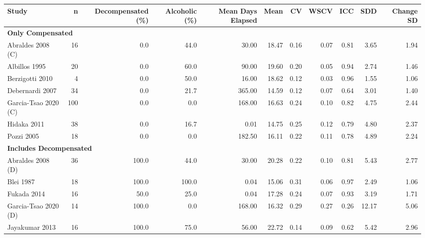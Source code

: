 \documentclass[
]{article}
\begin{document}
\begin{table}[H]
\centering
\begin{tabular}{l|r|r|r|r|r|r|r|r|r|r}
\hline
Study & n & Decompensated (\%) & Alcoholic (\%) & Mean Days Elapsed & Mean & CV & WSCV & ICC & SDD & Change SD\\
\hline
\multicolumn{11}{l}{\textbf{Only Compensated}}\\
\hline
\hspace{1em}Abraldes 2008 (C) & 16 & 0.0 & 44.0 & 30.00 & 18.47 & 0.16 & 0.07 & 0.81 & 3.65 & 1.94\\
\hline
\hspace{1em}Albillos 1995 & 20 & 0.0 & 60.0 & 90.00 & 19.60 & 0.20 & 0.05 & 0.94 & 2.74 & 1.46\\
\hline
\hspace{1em}Berzigotti 2010 & 4 & 0.0 & 50.0 & 16.00 & 18.62 & 0.12 & 0.03 & 0.96 & 1.55 & 1.06\\
\hline
\hspace{1em}Debernardi 2007 & 34 & 0.0 & 21.7 & 365.00 & 14.59 & 0.12 & 0.07 & 0.64 & 3.01 & 1.40\\
\hline
\hspace{1em}Garcia-Tsao 2020 (C) & 100 & 0.0 & 0.0 & 168.00 & 16.63 & 0.24 & 0.10 & 0.82 & 4.75 & 2.44\\
\hline
\hspace{1em}Hidaka 2011 & 38 & 0.0 & 16.7 & 0.01 & 14.75 & 0.25 & 0.12 & 0.79 & 4.80 & 2.37\\
\hline
\hspace{1em}Pozzi 2005 & 18 & 0.0 & 0.0 & 182.50 & 16.11 & 0.22 & 0.11 & 0.78 & 4.89 & 2.24\\
\hline
\multicolumn{11}{l}{\textbf{Includes Decompensated}}\\
\hline
\hspace{1em}Abraldes 2008 (D) & 36 & 100.0 & 44.0 & 30.00 & 20.28 & 0.22 & 0.10 & 0.81 & 5.43 & 2.77\\
\hline
\hspace{1em}Blei 1987 & 18 & 100.0 & 100.0 & 0.04 & 15.06 & 0.31 & 0.06 & 0.97 & 2.49 & 1.06\\
\hline
\hspace{1em}Fukada 2014 & 16 & 50.0 & 25.0 & 0.04 & 17.28 & 0.24 & 0.07 & 0.93 & 3.19 & 1.71\\
\hline
\hspace{1em}Garcia-Tsao 2020 (D) & 14 & 100.0 & 0.0 & 168.00 & 16.32 & 0.29 & 0.27 & 0.26 & 12.17 & 5.06\\
\hline
\hspace{1em}Jayakumar 2013 & 16 & 100.0 & 75.0 & 56.00 & 22.72 & 0.14 & 0.09 & 0.62 & 5.42 & 2.96\\

\end{tabular}
\end{table}
\end{document}
